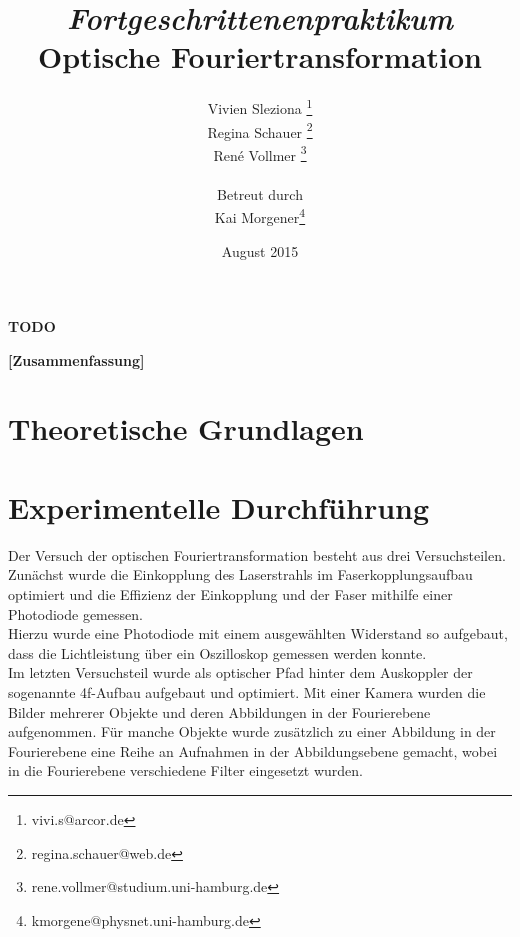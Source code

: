 \documentclass[12pt,a4paper]{article}
\begin{document}
	
	\textbf{TODO}
	
	
	
	\title{\textit{Fortgeschrittenenpraktikum}\\\textbf{Optische Fouriertransformation} }
	\date{August 2015}
	\author{Vivien Sleziona \footnote{vivi.s@arcor.de}\\ Regina Schauer \footnote{regina.schauer@web.de}\\ René Vollmer \footnote{rene.vollmer@studium.uni-hamburg.de} \\ \\Betreut durch\\ Kai Morgener\footnote{kmorgene@physnet.uni-hamburg.de}}
	
	\maketitle
	
	\begin{center} 
		\bigskip
		\bigskip
		
		\begin{minipage}{0.75\textwidth}
			\textbf{[Zusammenfassung]}
			
		\end{minipage}
	\end{center}
	
	\newpage
	
	\tableofcontents
	\vfill
	\newpage
	\clearpage	
	
	
	\section{Theoretische Grundlagen}
	

	
	\newpage
	\clearpage
	
	\section{Experimentelle Durchführung}
		Der Versuch der optischen Fouriertransformation besteht aus drei Versuchsteilen. Zunächst wurde die Einkopplung des Laserstrahls im Faserkopplungsaufbau optimiert und die Effizienz der Einkopplung und der Faser mithilfe einer Photodiode gemessen. \\
		Hierzu wurde eine Photodiode mit einem ausgewählten Widerstand so aufgebaut, dass die Lichtleistung über ein Oszilloskop gemessen werden konnte.\\
		Im letzten Versuchsteil wurde als optischer Pfad hinter dem Auskoppler der sogenannte 4f-Aufbau aufgebaut und optimiert. Mit einer Kamera wurden die Bilder mehrerer Objekte und deren Abbildungen in der Fourierebene aufgenommen. Für manche Objekte wurde zusätzlich zu einer Abbildung in der Fourierebene eine Reihe an Aufnahmen in der Abbildungsebene gemacht, wobei in die Fourierebene verschiedene Filter eingesetzt wurden.   
		
\end{document}
